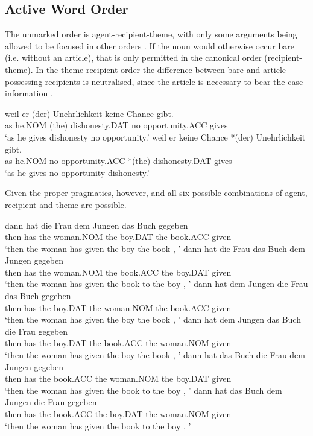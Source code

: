 \subsection{Active Word Order}
The unmarked order is agent-recipient-theme, with only some arguments being allowed to be focused in other orders \citep{Choi.1996}. If the noun would otherwise occur bare (i.e. without an article), that is only permitted in the canonical order (recipient-theme). In the theme-recipient order the difference between bare and article possessing recipients is neutralised, since the article is necessary to bear the case information \citep{Draye.1996}.
\begin{exe}
\ex \cite[162]{Draye.1996}
\begin{xlist}
\ex \gll weil er (der) Unehrlichkeit keine Chance gibt.\\
as he.NOM (the) dishonesty.DAT no opportunity.ACC gives\\
\trans `as he gives dishonesty no opportunity.'
\ex \gll weil er keine Chance *(der) Unehrlichkeit gibt.\\
as he.NOM  no opportunity.ACC *(the) dishonesty.DAT gives\\
\trans `as he gives no opportunity dishonesty.'
\end{xlist}
\end{exe}
Given the proper pragmatics, however, and all six possible combinations of agent, recipient and theme are possible.
\begin{exe}
\ex \gll  dann hat die Frau dem Jungen das Buch gegeben\\
then has the woman.NOM the boy.DAT the book.ACC given \\
`then the woman has given the boy the book \citep[ex 1a]{Czepluch.1990}, \citep[20a]{Choi.1996}'
\ex \gll dann hat die Frau das Buch dem Jungen gegeben\\
then has the woman.NOM the book.ACC the boy.DAT given\\
`then the woman has given the book to the boy \citep[ex 1b]{Czepluch.1990}, \citep[20b]{Choi.1996}'
\ex \gll dann hat dem Jungen die Frau das Buch gegeben \\
then has the boy.DAT the woman.NOM the book.ACC given\\
`then the woman has given the boy the book \citep[ex 1c]{Czepluch.1990}, \citep[20c]{Choi.1996}'
\ex \gll dann hat dem Jungen das Buch die Frau gegeben\\
then has the boy.DAT the book.ACC the woman.NOM given\\
`then the woman has given the boy the book \citep[ex 1d]{Czepluch.1990}, \citep[20e]{Choi.1996}'
\ex \gll dann hat das Buch die Frau dem Jungen gegeben\\
then has the book.ACC the woman.NOM the boy.DAT given\\
`then the woman has given the book to the boy \citep[ex 1e]{Czepluch.1990}, \citep[20d]{Choi.1996}'
\ex \gll dann hat das Buch dem Jungen die Frau gegeben \\
then has the book.ACC the boy.DAT the woman.NOM given \\
`then the woman has given the book to the boy \citep[ex 1f]{Czepluch.1990}, \citep[20f]{Choi.1996}'
\end{exe}
